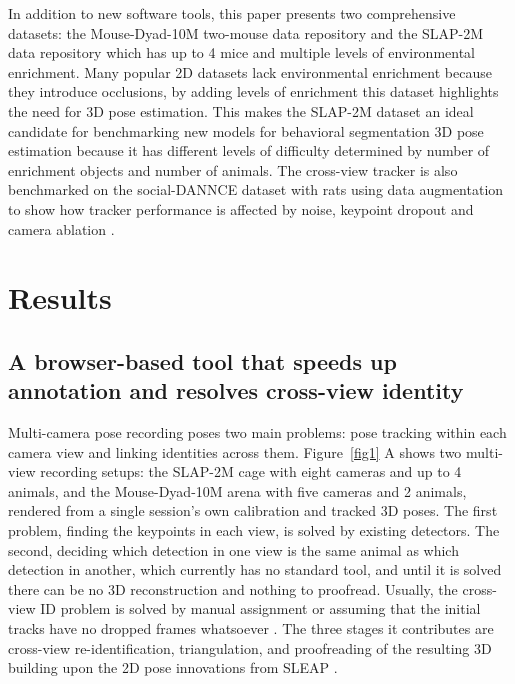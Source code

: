\documentclass[pdflatex, sn-nature]{sn-jnl}
\theoremstyle{thmstyleone}%
\theoremstyle{thmstyletwo}%
\theoremstyle{thmstylethree}%
\begin{document}
In addition to new software tools, this paper presents two comprehensive datasets: the Mouse-Dyad-10M two-mouse data repository and the SLAP-2M data repository which has up to 4 mice and multiple levels of environmental enrichment. Many popular 2D datasets lack environmental enrichment because they introduce occlusions, by adding levels of enrichment this dataset highlights the need for 3D pose estimation. This makes the SLAP-2M dataset an ideal candidate for benchmarking new models for behavioral segmentation 3D pose estimation because it has different levels of difficulty determined by number of enrichment objects and number of animals. The cross-view tracker is also benchmarked on the social-DANNCE dataset with rats using data augmentation to show how tracker performance is affected by noise, keypoint dropout and camera ablation \citep{Klibaite2025}.

\section{Results}\label{sec2}

\subsection{A browser-based tool that speeds up annotation and resolves cross-view identity}\label{subsec2-1}

Multi-camera pose recording poses two main problems: pose tracking within each camera view and linking identities across them. Figure~\ref{fig1} A shows two multi-view recording setups: the SLAP-2M cage with eight cameras and up to 4 animals, and the Mouse-Dyad-10M arena with five cameras and 2 animals, rendered from a single session's own calibration and tracked 3D poses. The first problem, finding the keypoints in each view, is solved by existing detectors. The second, deciding which detection in one view is the same animal as which detection in another, which currently has no standard tool, and until it is solved there can be no 3D reconstruction and nothing to proofread. Usually, the cross-view ID problem is solved by manual assignment or assuming that the initial tracks have no dropped frames whatsoever \citep{Klibaite2025, Waldmann2024}. The three stages it contributes are cross-view re-identification, triangulation, and proofreading of the resulting 3D building upon the 2D pose innovations from SLEAP \citep{Pereira2022}.
\end{document}
